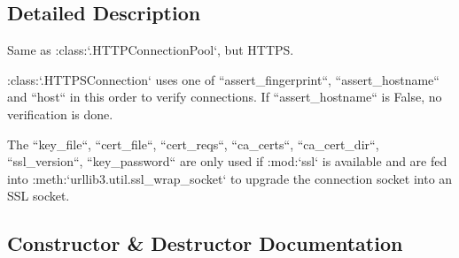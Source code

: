\subsection{Detailed Description}
\begin{DoxyVerb}Same as :class:`.HTTPConnectionPool`, but HTTPS.

:class:`.HTTPSConnection` uses one of ``assert_fingerprint``,
``assert_hostname`` and ``host`` in this order to verify connections.
If ``assert_hostname`` is False, no verification is done.

The ``key_file``, ``cert_file``, ``cert_reqs``, ``ca_certs``,
``ca_cert_dir``, ``ssl_version``, ``key_password`` are only used if :mod:`ssl`
is available and are fed into :meth:`urllib3.util.ssl_wrap_socket` to upgrade
the connection socket into an SSL socket.
\end{DoxyVerb}
 

\subsection{Constructor \& Destructor Documentation}
\mbox{\label{classpip_1_1__vendor_1_1urllib3_1_1connectionpool_1_1HTTPSConnectionPool_aa077a877a1e825700ecc3d9311a967b9}} 
